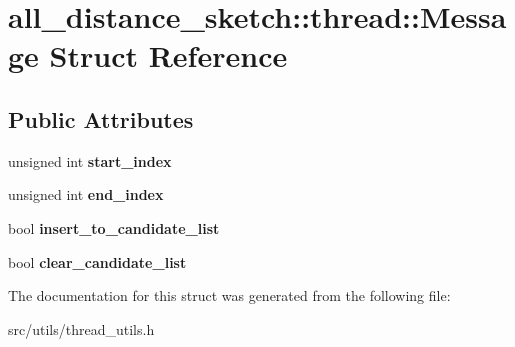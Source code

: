 \hypertarget{structall__distance__sketch_1_1thread_1_1Message}{}\section{all\+\_\+distance\+\_\+sketch\+:\+:thread\+:\+:Message Struct Reference}
\label{structall__distance__sketch_1_1thread_1_1Message}
\subsection*{Public Attributes}
\begin{DoxyCompactItemize}
\item 
\hypertarget{structall__distance__sketch_1_1thread_1_1Message_a10fea80b01ebca2769bfaa1ad3168f2c}{}unsigned int {\bfseries start\+\_\+index}\label{structall__distance__sketch_1_1thread_1_1Message_a10fea80b01ebca2769bfaa1ad3168f2c}

\item 
\hypertarget{structall__distance__sketch_1_1thread_1_1Message_ac64b6f5c9340352c1c9d7ea469a61ea4}{}unsigned int {\bfseries end\+\_\+index}\label{structall__distance__sketch_1_1thread_1_1Message_ac64b6f5c9340352c1c9d7ea469a61ea4}

\item 
\hypertarget{structall__distance__sketch_1_1thread_1_1Message_a94f523f00007a69c56f9b1dd12ae92e6}{}bool {\bfseries insert\+\_\+to\+\_\+candidate\+\_\+list}\label{structall__distance__sketch_1_1thread_1_1Message_a94f523f00007a69c56f9b1dd12ae92e6}

\item 
\hypertarget{structall__distance__sketch_1_1thread_1_1Message_a057c9973d85df65113ea4031621521d4}{}bool {\bfseries clear\+\_\+candidate\+\_\+list}\label{structall__distance__sketch_1_1thread_1_1Message_a057c9973d85df65113ea4031621521d4}

\end{DoxyCompactItemize}


The documentation for this struct was generated from the following file\+:\begin{DoxyCompactItemize}
\item 
src/utils/thread\+\_\+utils.\+h\end{DoxyCompactItemize}
